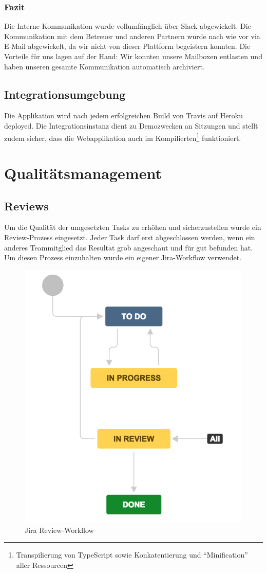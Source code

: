 \subsection{Fazit}
Die Interne Kommunikation wurde vollumfänglich über Slack abgewickelt. Die Kommunikation mit dem Betreuer und anderen Partnern wurde nach wie vor via E-Mail abgewickelt, da wir \proff nicht von dieser Plattform begeistern konnten.
Die Vorteile für uns lagen auf der Hand: Wir konnten unsere Mailboxen entlasten und haben unseren gesamte Kommunikation automatisch archiviert.

\section{Integrationsumgebung}
Die Applikation wird nach jedem erfolgreichen Build von Travis auf Heroku deployed. Die Integrationsinstanz dient zu Demozwecken an Sitzungen und stellt zudem sicher, dass die Webapplikation auch im Kompilierten\footnote{Transpilierung von TypeScript sowie Konkatentierung und ``Minification'' aller Ressourcen} funktioniert.


\chapter{Qualitätsmanagement}

\section{Reviews}

Um die Qualität der umgesetzten Tasks zu erhöhen und sicherzustellen wurde ein Review-Prozess eingesetzt. Jeder Task darf erst abgeschlossen werden, wenn ein anderes Teammitglied das Resultat grob angeschaut und für gut befunden hat. Um diesen Prozess einzuhalten wurde ein eigener Jira-Workflow verwendet.

\begin{figure}
\centering
\includegraphics[width=0.7\linewidth]{fig/jira-workflow}
\caption{Jira Review-Workflow}
\label{fig:jira-workflow}
\end{figure}

